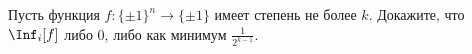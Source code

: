 Пусть функция $f\colon \{\pm 1\}^n \to \{\pm 1\}$ имеет степень не более $k$. Докажите, что $\Inf_i[f]$
либо $0$, либо как минимум $\frac{1}{2^{k - 1}}$.